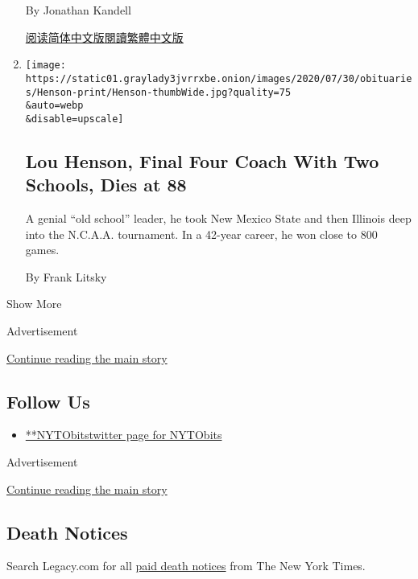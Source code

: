 \begin{enumerate}
  By Jonathan Kandell

  \href{https://cn.nytimes3xbfgragh.onion/asia-pacific/20200730/lee-teng-hui-dead/}{阅读简体中文版}\href{https://cn.nytimes3xbfgragh.onion/asia-pacific/20200730/lee-teng-hui-dead/zh-hant/}{閱讀繁體中文版}
\item
  \href{/2020/07/29/sports/ncaabasketball/lou-henson-dead.html}{}

  \texttt{[image: https://static01.graylady3jvrrxbe.onion/images/2020/07/30/obituaries/Henson-print/Henson-thumbWide.jpg?quality=75\\\&auto=webp\\\&disable=upscale]}

  \hypertarget{lou-henson-final-four-coach-with-two-schools-dies-at-88}{%
  \subsection{Lou Henson, Final Four Coach With Two Schools, Dies at
  88}\label{lou-henson-final-four-coach-with-two-schools-dies-at-88}}

  A genial ``old school'' leader, he took New Mexico State and then
  Illinois deep into the N.C.A.A. tournament. In a 42-year career, he
  won close to 800 games.

  By Frank Litsky
\end{enumerate}

Show More

Advertisement

\protect\hyperlink{after-mid3}{Continue reading the main story}

\hypertarget{follow-us}{%
\subsection{Follow Us}\label{follow-us}}

\begin{itemize}
\tightlist
\item
  \href{https://twitter.com/NYTObits}{**NYTObitstwitter page for
  NYTObits}
\end{itemize}

Advertisement

\protect\hyperlink{after-mktg}{Continue reading the main story}

\hypertarget{death-notices}{%
\subsection{Death Notices}\label{death-notices}}

Search Legacy.com for all \href{https://www.legacy.com/NYTimes/}{paid
death notices} from The New York Times.


